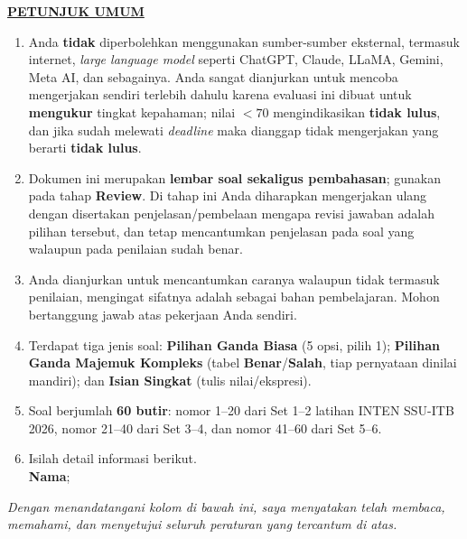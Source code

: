 \documentclass[11pt]{article}
\begin{document}
\noindent\textbf{\underline{PETUNJUK UMUM}}
\begin{enumerate}[leftmargin=*,itemsep=4pt,topsep=4pt]
  \item Anda \textbf{tidak} diperbolehkan menggunakan sumber-sumber eksternal,
        termasuk internet, \textit{large language model} seperti ChatGPT, Claude,
        LLaMA, Gemini, Meta AI, dan sebagainya. Anda sangat dianjurkan untuk
        mencoba mengerjakan sendiri terlebih dahulu karena evaluasi ini dibuat
        untuk \textbf{mengukur} tingkat kepahaman; nilai $<70$ mengindikasikan
        \textbf{tidak lulus}, dan jika sudah melewati \textit{deadline} maka
        dianggap tidak mengerjakan yang berarti \textbf{tidak lulus}.

  \item Dokumen ini merupakan \textbf{lembar soal sekaligus pembahasan}; gunakan
        pada tahap \textbf{Review}. Di tahap ini Anda diharapkan mengerjakan ulang
        dengan disertakan penjelasan/pembelaan mengapa revisi jawaban adalah pilihan
        tersebut, dan tetap mencantumkan penjelasan pada soal yang walaupun pada
        penilaian sudah benar.

  \item Anda dianjurkan untuk mencantumkan caranya walaupun tidak termasuk
        penilaian, mengingat sifatnya adalah sebagai bahan pembelajaran.
        Mohon bertanggung jawab atas pekerjaan Anda sendiri.

  \item Terdapat tiga jenis soal: \textbf{Pilihan Ganda Biasa} (5 opsi, pilih 1);
        \textbf{Pilihan Ganda Majemuk Kompleks} (tabel \textbf{Benar}/\textbf{Salah},
        tiap pernyataan dinilai mandiri); dan \textbf{Isian Singkat}
        (tulis nilai/ekspresi).

  \item Soal berjumlah \textbf{60 butir}: nomor 1--20 dari Set 1--2 latihan INTEN
        SSU-ITB 2026, nomor 21--40 dari Set 3--4, dan nomor 41--60 dari Set 5--6.

  \item Isilah detail informasi berikut.\\[0.3em]
        \textbf{Nama}\hspace{0.45cm};\enspace\underline{\hspace{8cm}}
\end{enumerate}

\vspace{0.6cm}
\noindent\textit{Dengan menandatangani kolom di bawah ini, saya menyatakan telah membaca,
memahami, dan menyetujui seluruh peraturan yang tercantum di atas.}
\end{document}
